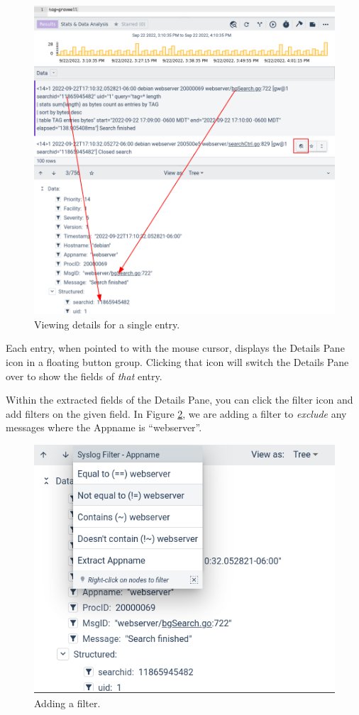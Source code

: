 \begin{figure}
	\includegraphics[width=0.8\linewidth]{images/details-pane.png}
	\caption{Viewing details for a single entry.}
	\label{fig:details-pane}
\end{figure}

Each entry, when pointed to with the mouse cursor, displays the Details Pane icon in a floating button group. Clicking that icon will switch the Details Pane over to show the fields of \emph{that} entry.

Within the extracted fields of the Details Pane, you can click the filter icon and add filters on the given field. In Figure \ref{fig:filter}, we are adding a filter to \emph{exclude} any messages where the Appname is ``webserver''.

\begin{figure}
	\includegraphics[width=0.8\linewidth]{images/filter.png}
	\caption{Adding a filter.}
	\label{fig:filter}
\end{figure}


